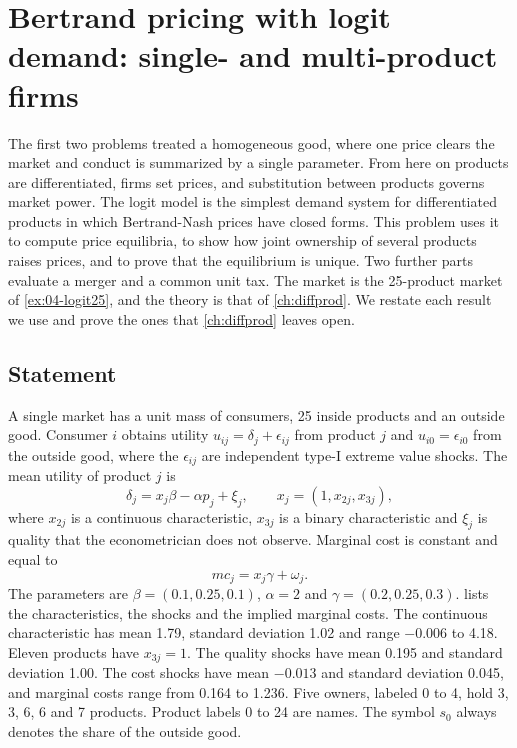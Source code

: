 \section{Bertrand pricing with logit demand: single- and multi-product firms}\label{sec:C-logit-bertrand}

The first two problems treated a homogeneous good, where one price clears the market and conduct is summarized by
a single parameter. From here on products are differentiated, firms set prices, and substitution between products
governs market power. The logit model is the simplest demand system for differentiated products in which
Bertrand-Nash prices have closed forms. This problem uses it to compute price equilibria, to show how joint ownership of several products
raises prices, and to prove that the equilibrium is unique. Two further parts evaluate a merger and a common unit
tax. The market is the 25-product market of \cref{ex:04-logit25}, and the theory is that of \cref{ch:diffprod}. We
restate each result we use and prove the ones that \cref{ch:diffprod} leaves open.

\subsection{Statement}

A single market has a unit mass of consumers, 25 inside products and an outside good. Consumer $i$ obtains utility
$u_{ij} = \delta_j + \epsilon_{ij}$ from product $j$ and $u_{i0} = \epsilon_{i0}$ from the outside good, where the
$\epsilon_{ij}$ are independent type-I extreme value shocks. The mean utility of product $j$ is
\begin{equation}\label{eq:C-logit-delta}
  \delta_j = x_j\beta - \alpha p_j + \xi_j , \qquad x_j = (1, x_{2j}, x_{3j}) ,
\end{equation}
where $x_{2j}$ is a continuous characteristic, $x_{3j}$ is a binary characteristic and $\xi_j$ is quality that
the econometrician does not observe. Marginal cost is constant and equal to
\begin{equation}\label{eq:C-logit-mc}
  mc_j = x_j\gamma + \omega_j .
\end{equation}
The parameters are $\beta = (0.1, 0.25, 0.1)$, $\alpha = 2$ and $\gamma = (0.2, 0.25, 0.3)$.
 lists the characteristics, the shocks and the implied marginal costs. The continuous
characteristic has mean 1.79, standard deviation 1.02 and range $-0.006$ to 4.18. Eleven products have $x_{3j} = 1$.
The quality shocks have mean 0.195 and standard deviation 1.00. The cost shocks have mean $-0.013$ and standard
deviation 0.045, and marginal costs range from 0.164 to 1.236. Five owners, labeled 0 to 4, hold 3, 3, 6, 6 and 7
products. Product labels 0 to 24 are names. The symbol $s_0$ always denotes the share of the outside good.

